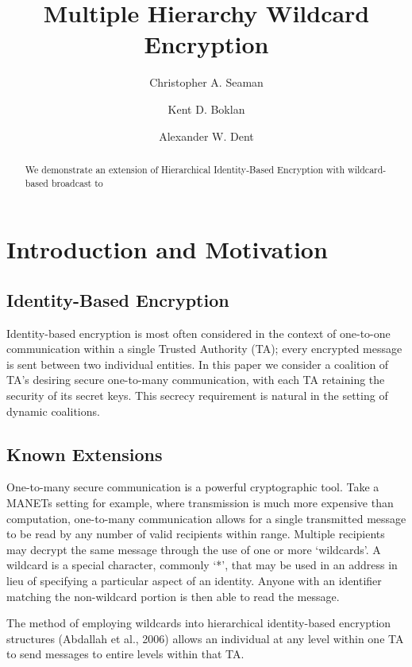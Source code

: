 \documentclass[10pt]{llncs}
\title{Multiple Hierarchy Wildcard Encryption}
\author{Christopher A. Seaman\inst{1} \and
		Kent D. Boklan\inst{2} \and
		Alexander W. Dent\inst{3}}
\institute{Graduate Center, City University of New York, USA \and
			Queens College, City University of New York, USA \and
			Royal Holloway, University of London, UK}
\begin{document}
\maketitle

\begin{abstract}
 We demonstrate an extension of Hierarchical Identity-Based Encryption with wildcard-based broadcast to 
\end{abstract}


\section{Introduction and Motivation}
\subsection{Identity-Based Encryption}

Identity-based encryption is most often considered in the context of one-to-one communication within a single Trusted Authority (TA); every encrypted message is sent between two individual entities.  In this paper we consider a coalition of TA's desiring secure one-to-many communication, with each TA retaining the security of its secret keys.  This secrecy requirement is natural in the setting of dynamic coalitions.

\subsection{Known Extensions}

	One-to-many secure communication is a powerful cryptographic tool.  Take a MANETs setting for example, where transmission is much more expensive than computation, one-to-many communication allows for a single transmitted message to be read by any number of valid recipients within range.  Multiple recipients may decrypt the same message through the use of one or more `wildcards'. A wildcard is a special character, commonly `*', that may be used in an address in lieu of specifying a particular aspect of an identity. Anyone with an identifier matching the non-wildcard portion is then able to read the message.
	
	The method of employing wildcards into hierarchical identity-based encryption structures (Abdallah et al., 2006) allows an individual at any level within one TA to send messages to entire levels within that TA.
\end{document}

